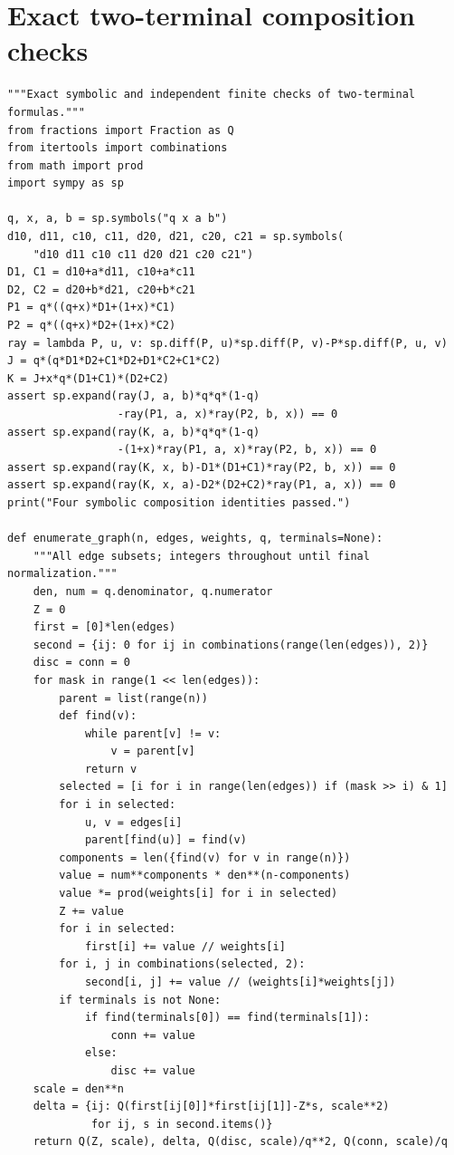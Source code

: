 \documentclass[11pt,a4paper]{article}
\theoremstyle{definition}
\theoremstyle{remark}\newtheorem{remark}[theorem]{Remark}
\begin{document}
\clearpage\section{Exact two-terminal composition checks}

\begin{lstlisting}
"""Exact symbolic and independent finite checks of two-terminal formulas."""
from fractions import Fraction as Q
from itertools import combinations
from math import prod
import sympy as sp

q, x, a, b = sp.symbols("q x a b")
d10, d11, c10, c11, d20, d21, c20, c21 = sp.symbols(
    "d10 d11 c10 c11 d20 d21 c20 c21")
D1, C1 = d10+a*d11, c10+a*c11
D2, C2 = d20+b*d21, c20+b*c21
P1 = q*((q+x)*D1+(1+x)*C1)
P2 = q*((q+x)*D2+(1+x)*C2)
ray = lambda P, u, v: sp.diff(P, u)*sp.diff(P, v)-P*sp.diff(P, u, v)
J = q*(q*D1*D2+C1*D2+D1*C2+C1*C2)
K = J+x*q*(D1+C1)*(D2+C2)
assert sp.expand(ray(J, a, b)*q*q*(1-q)
                 -ray(P1, a, x)*ray(P2, b, x)) == 0
assert sp.expand(ray(K, a, b)*q*q*(1-q)
                 -(1+x)*ray(P1, a, x)*ray(P2, b, x)) == 0
assert sp.expand(ray(K, x, b)-D1*(D1+C1)*ray(P2, b, x)) == 0
assert sp.expand(ray(K, x, a)-D2*(D2+C2)*ray(P1, a, x)) == 0
print("Four symbolic composition identities passed.")

def enumerate_graph(n, edges, weights, q, terminals=None):
    """All edge subsets; integers throughout until final normalization."""
    den, num = q.denominator, q.numerator
    Z = 0
    first = [0]*len(edges)
    second = {ij: 0 for ij in combinations(range(len(edges)), 2)}
    disc = conn = 0
    for mask in range(1 << len(edges)):
        parent = list(range(n))
        def find(v):
            while parent[v] != v:
                v = parent[v]
            return v
        selected = [i for i in range(len(edges)) if (mask >> i) & 1]
        for i in selected:
            u, v = edges[i]
            parent[find(u)] = find(v)
        components = len({find(v) for v in range(n)})
        value = num**components * den**(n-components)
        value *= prod(weights[i] for i in selected)
        Z += value
        for i in selected:
            first[i] += value // weights[i]
        for i, j in combinations(selected, 2):
            second[i, j] += value // (weights[i]*weights[j])
        if terminals is not None:
            if find(terminals[0]) == find(terminals[1]):
                conn += value
            else:
                disc += value
    scale = den**n
    delta = {ij: Q(first[ij[0]]*first[ij[1]]-Z*s, scale**2)
             for ij, s in second.items()}
    return Q(Z, scale), delta, Q(disc, scale)/q**2, Q(conn, scale)/q


\end{lstlisting}
\end{document}
